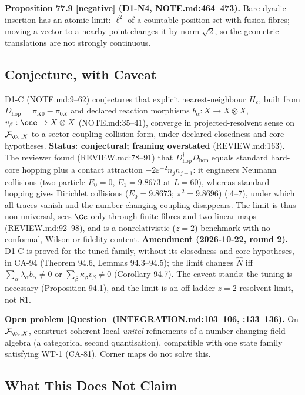 \textbf{Proposition 77.9 [negative] (D1-N4, NOTE.md:464--473).}  Bare dyadic
insertion has an atomic limit: \(\ell^2\) of a countable position set with fusion
fibres; moving a vector to a nearby point changes it by norm \(\sqrt2\), so the
geometric translations are not strongly continuous.

\subsection{Conjecture, with Caveat}

D1-C (NOTE.md:9--62) conjectures that explicit nearest-neighbour \(H_\varepsilon\),
built from \(D_{\mathrm{hop}}=\pi_{X0}-\pi_{0X}\) and declared reaction morphisms
\(b_\alpha:X\to X\otimes X\), \(v_\beta:\one\to X\otimes X\) (NOTE.md:35--41), converge
in projected-resolvent sense on \(\mathcal F_{\Cc,X}\) to a sector-coupling collision
form, under declared closedness and core hypotheses.  \textbf{Status: conjectural;
framing overstated} (REVIEW.md:163).  The reviewer found (REVIEW.md:78--91) that
\(D_{\mathrm{hop}}^\dagger D_{\mathrm{hop}}\) equals standard hard-core hopping
plus a contact attraction \(-2\varepsilon^{-2}n_jn_{j+1}\): it engineers Neumann
collisions (two-particle \(E_0=0\), \(E_1=9.8673\) at \(L=60\)), whereas standard
hopping gives Dirichlet collisions (\(E_0=9.8673\); \(\pi^2=9.8696\))
(:4--7), under which all traces vanish
and the number-changing coupling disappears.  The limit is thus non-universal,
sees \(\Cc\) only through finite fibres and two linear maps (REVIEW.md:92--98), and is
a nonrelativistic (\(z=2\)) benchmark with no conformal, Wilson or fidelity content.
\textbf{Amendment (2026-10-22, round 2).}  D1-C is proved for the tuned family, without its closedness and core hypotheses,
in CA-94 (Theorem 94.6, Lemmas 94.3--94.5); the limit changes \(\hat N\) iff \(\sum_\alpha\lambda_\alpha b_\alpha\neq0\) or \(\sum_\beta\kappa_\beta v_\beta\neq0\)
(Corollary 94.7).  The caveat stands: the tuning is necessary (Proposition 94.1), and the limit is an off-ladder \(z{=}2\) resolvent limit, not \(\mathsf R1\).

\textbf{Open problem [Question] (INTEGRATION.md:103--106, :133--136).}  On
\(\mathcal F_{\Cc,X}\), construct coherent local \emph{unital} refinements of a
number-changing field algebra (a categorical second quantisation), compatible
with one state family satisfying WT-1 (CA-81).  Corner maps do not solve this.

\subsection{What This Does Not Claim}

